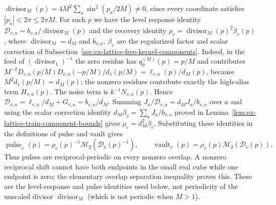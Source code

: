 $\operatorname{divisor}_M(p)=4M^2\sum_a\sin^2(p_a/2M)\neq0$, since every
coordinate satisfies $|p_a|<2\pi\le2\pi M$. For such $p$ we have the level response identity
$\mathscr D_{v,a}=b_{v,a}/\operatorname{divisor}_M(p)$ and the recovery
identity $\rho_v=\operatorname{divisor}_M(p)^2\beta_v(p)$, where
$\operatorname{divisor}_M=d_M$ and $b_{v,a}$, $\beta_v$ are the regularized factor and
scalar correction of Subsection~\ref{sec:ex-lattice-free-kernel-components}. Indeed, in the
feed of $(\operatorname{divisor}_1)^{-1}$ the zero residue has $q_0^{(M)}(p)=p/M$
and contributes
$M^{-2}D_{v,a}(p/M)D_{v,a}(-p/M)/d_1(p/M)=\ell_{v,a}(p)/d_M(p)$, because
$M^2d_1(p/M)=d_M(p)$; the nonzero residues contribute exactly the
high-alias term $H_{v,a}(p)$. The noise term is $k^{-1}N_{v,a}(p)$. Hence
$\mathscr D_{v,a}=\ell_{v,a}/d_M+G_{v,a}=b_{v,a}/d_M$. Summing
$J_a/\mathscr D_{v,a}=d_MJ_a/b_{v,a}$ over $a$ and using the scalar correction identity
$d_M\beta_v=\sum_aJ_a/b_{v,a}$ proved in
Lemma~\ref{lem:ex-lattice-train-component-bounds} gives
$\rho_v=d_M^2\beta_v$. Substituting
these identities in the definitions of pulse and vault gives
\[
 \operatorname{pulse}_v(p)=\rho_v(p)^{-1}
        \mathcal M_2(\mathscr D_v(p)^{-1}),\qquad
 \operatorname{vault}_v(p)=\rho_v(p)\mathcal M_2(\mathscr D_v(p)).
\]
Thus pulses are reciprocal-periodic on every nonzero overlap. A nonzero
reciprocal shift cannot have both endpoints in the small real cube while one
endpoint is zero; the elementary overlap separation inequality proves this.
These are the level-response and pulse identities used below, not
periodicity of the unscaled divisor $\operatorname{divisor}_M$ (which is
not periodic when $M>1$).

